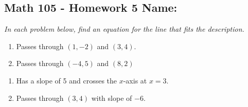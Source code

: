 \documentclass[11pt]{article}
\begin{document}
\pagestyle{empty}
\subsection*{Math 105 - Homework 5 \hfill Name: \underline{\hspace*{2in}}}


\noindent 
\textit{In each problem below, find an equation for the line that fits the description.}
\begin{multicols}{2}
\begin{enumerate}
\setcounter{enumi}{\theenumCount}
\item Passes through $(1,-2)$ and $(3,4)$.
\item Passes through $(-4,5)$ and $(8,2)$ 
\setcounter{enumCount}{\theenumi}
\end{enumerate}
\end{multicols}
\vfill




\begin{multicols}{2}
\begin{enumerate}
\setcounter{enumi}{\theenumCount}
\item Has a slope of 5 and crosses the $x$-axis at $x=3$.
\item Passes through $(3,4)$ with slope of $-6$.
\setcounter{enumCount}{\theenumi}
\end{enumerate}
\end{multicols}
\vfill
\end{document}
